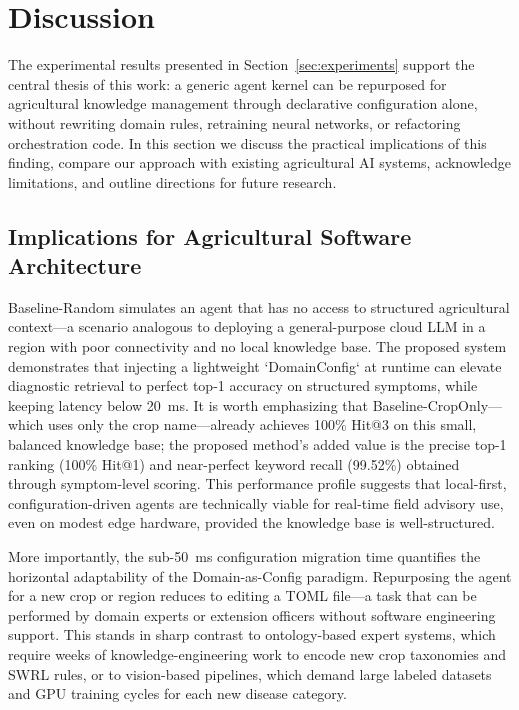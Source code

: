 \documentclass[11pt,a4paper]{article}
\begin{document}
\section{Discussion}
\label{sec:discussion}

The experimental results presented in Section~\ref{sec:experiments} support the central thesis of this work: a generic agent kernel can be repurposed for agricultural knowledge management through declarative configuration alone, without rewriting domain rules, retraining neural networks, or refactoring orchestration code. In this section we discuss the practical implications of this finding, compare our approach with existing agricultural AI systems, acknowledge limitations, and outline directions for future research.

\subsection{Implications for Agricultural Software Architecture}

Baseline-Random simulates an agent that has no access to structured agricultural context---a scenario analogous to deploying a general-purpose cloud LLM in a region with poor connectivity and no local knowledge base. The proposed system demonstrates that injecting a lightweight `DomainConfig` at runtime can elevate diagnostic retrieval to perfect top-1 accuracy on structured symptoms, while keeping latency below 20~ms. It is worth emphasizing that Baseline-CropOnly---which uses only the crop name---already achieves 100\% Hit@3 on this small, balanced knowledge base; the proposed method's added value is the precise top-1 ranking (100\% Hit@1) and near-perfect keyword recall (99.52\%) obtained through symptom-level scoring. This performance profile suggests that local-first, configuration-driven agents are technically viable for real-time field advisory use, even on modest edge hardware, provided the knowledge base is well-structured.

More importantly, the sub-50~ms configuration migration time quantifies the horizontal adaptability of the Domain-as-Config paradigm. Repurposing the agent for a new crop or region reduces to editing a TOML file---a task that can be performed by domain experts or extension officers without software engineering support. This stands in sharp contrast to ontology-based expert systems, which require weeks of knowledge-engineering work to encode new crop taxonomies and SWRL rules, or to vision-based pipelines, which demand large labeled datasets and GPU training cycles for each new disease category.
\end{document}
